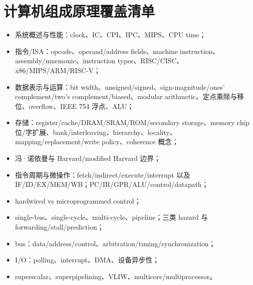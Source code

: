 \documentclass[11pt,a4paper,openany]{ctexbook}
\begin{document}
\section{计算机组成原理覆盖清单}
\begin{itemize}
  \item 系统概述与性能：clock、IC、CPI、IPC、MIPS、CPU time；
  \item 指令/ISA：opcode、operand/address fields、machine instruction、assembly/mnemonic、instruction types、RISC/CISC、x86/MIPS/ARM/RISC-V；
  \item 数据表示与运算：bit width、unsigned/signed、sign-magnitude/ones' complement/two's complement/biased、modular arithmetic、定点乘除与移位、overflow、IEEE 754 浮点、ALU；
  \item 存储：register/cache/DRAM/SRAM/ROM/secondary storage、memory chip 位/字扩展、bank/interleaving、hierarchy、locality、mapping/replacement/write policy、coherence 概念；
  \item 冯·诺依曼与 Harvard/modified Harvard 边界；
  \item 指令周期与微操作：fetch/indirect/execute/interrupt 以及 IF/ID/EX/MEM/WB；PC/IR/GPR/ALU/control/datapath；
  \item hardwired vs microprogrammed control；
  \item single-bus、single-cycle、multi-cycle、pipeline；三类 hazard 与 forwarding/stall/prediction；
  \item bus：data/address/control、arbitration/timing/synchronization；
  \item I/O：polling、interrupt、DMA、设备异步性；
  \item superscalar、superpipelining、VLIW、multicore/multiprocessor。
\end{itemize}
\end{document}
